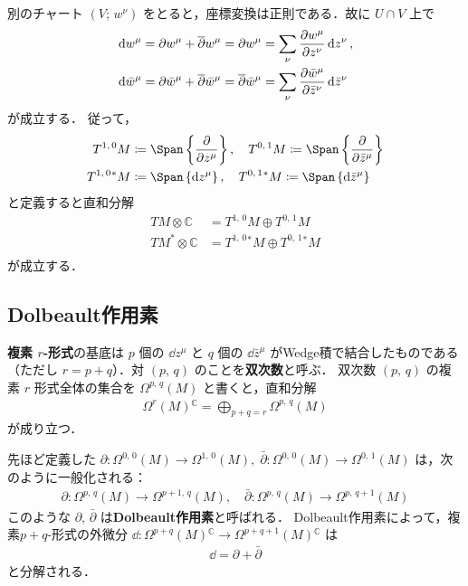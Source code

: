 \documentclass[geometry_main]{subfiles}
\begin{document}
別のチャート $(V;\, w^\nu)$ をとると，座標変換は正則である．故に $U \cap V$ 上で
\begin{align} 
	\dd{w^\mu} &= \partial w^\mu + \overline{\partial} w^\mu = \partial w^\mu = \sum_\nu \pdv{w^\mu}{z^\nu} \dd{z^\nu}, \\
	\dd{\bar{w}^\mu} &= \partial \bar{w}^\mu + \overline{\partial} \bar{w}^\mu = \overline{\partial} \bar{w}^\mu = \sum_\nu \pdv{\bar{w}^\mu}{\bar{z}^\nu} \dd{\bar{z}^\nu}
\end{align}
が成立する．
従って，
\begin{align} 
	T^{1,\, 0}M &\coloneqq \Span \left\{ \pdv{}{z^\mu} \right\},\quad  T^{0,\, 1}M \coloneqq \Span \left\{ \pdv{}{\bar{z}^\mu} \right\} \\
	T^{1,\, 0}{}^*M &\coloneqq \Span \left\{ \dd{z^\mu} \right\},\quad  T^{0,\, 1}{}^*M \coloneqq \Span \left\{ \dd{\bar{z}^\mu} \right\} \\
\end{align}
と定義すると直和分解
\begin{align} 
	TM \otimes \mathbb{C} &= T^{1,\, 0}M \oplus T^{0,\, 1}M \\
	TM^* \otimes \mathbb{C} &= T^{1,\, 0}{}^*M \oplus T^{0,\, 1}{}^*M \\
\end{align}
が成立する．

\subsection{Dolbeault作用素}

\textbf{複素 $r$-形式}の基底は $p$ 個の $\dd{z^\mu}$ と $q$ 個の $\dd{\bar{z}^\mu}$ がWedge積で結合したものである（ただし $r = p+q$）．対 $(p,\, q)$ のことを\textbf{双次数}と呼ぶ．
双次数 $(p,\, q)$ の複素 $r$ 形式全体の集合を $\Omega^{p,\, q}(M)$ と書くと，直和分解
\begin{align} 
	\Omega^r(M){}^\mathbb{C} = \bigoplus_{p+q = r} \Omega^{p,\, q}(M)
\end{align}
が成り立つ．

先ほど定義した $\partial \colon \Omega^{0,\, 0}(M) \to \Omega^{1,\, 0}(M),\; \bar{\partial} \colon \Omega^{0,\, 0}(M) \to \Omega^{0,\, 1}(M)$ は，次のように一般化される：
\begin{align} 
	\partial \colon \Omega^{p,\, q}(M) \to \Omega^{p+1,\, q}(M),\quad \bar{\partial} \colon \Omega^{p,\, q}(M) \to \Omega^{p,\, q+1}(M)
\end{align}
このような $\partial,\, \bar{\partial}$ は\textbf{Dolbeault作用素}と呼ばれる．
Dolbeault作用素によって，複素$p+q$-形式の外微分 $\dd{} \colon \Omega^{p+q}(M){}^\mathbb{C} \to \Omega^{p+q+1}(M){}^\mathbb{C}$ は
\begin{align} 
	\dd{} = \partial + \bar{\partial}
\end{align}
と分解される．
\end{document}
